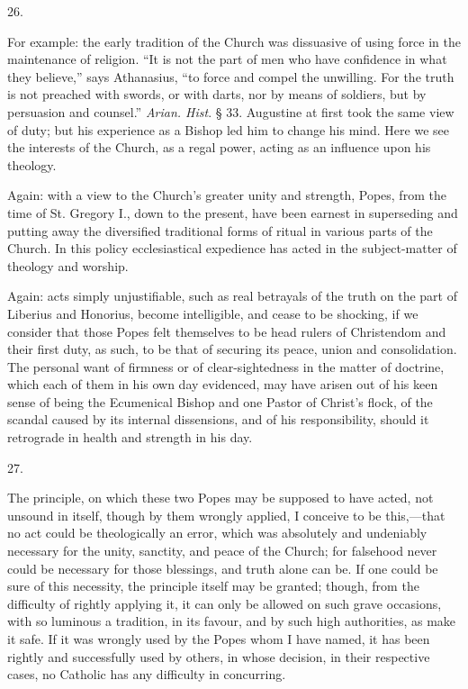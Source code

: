 26.

For example: the early tradition of the Church was dissuasive of
using force in the maintenance of religion. ``It is not the part
of men who have confidence in what they believe,'' says Athanasius,
``to force and compel the unwilling. For the truth is not preached
with swords, or with darts, nor by means of soldiers, but by
persuasion and counsel.'' \emph{Arian. Hist}. § 33. Augustine at
first took the same view of duty; but his experience as a Bishop led
him to change his mind. Here we see the interests of the Church, as a
regal power, acting as an influence upon his theology.

Again: with a view to the Church's greater unity and strength,
Popes, from the time of St. Gregory I., down to the present, have been
earnest in superseding and putting away the diversified traditional
forms of ritual in various parts of the Church. In this policy
ecclesiastical expedience has acted in the subject-matter of theology
and worship.

Again: acts simply unjustifiable, such as real betrayals of the
truth on the part of Liberius and Honorius, become intelligible, and
cease to be shocking, if we consider that those Popes felt themselves
to be head rulers of Christendom and their first duty, as
such, to be that of securing its peace, union and consolidation. The
personal want of firmness or of clear-sightedness in the matter of
doctrine, which each of them in his own day evidenced, may have arisen
out of his keen sense of being the Ecumenical Bishop and one Pastor of
Christ's flock, of the scandal caused by its internal dissensions, and
of his responsibility, should it retrograde in health and strength in
his day.

27.

The principle, on which these two Popes may be supposed to have
acted, not unsound in itself, though by them wrongly applied, I
conceive to be this,—that no act could be theologically an error,
which was absolutely and undeniably necessary for the unity, sanctity,
and peace of the Church; for falsehood never could be necessary for
those blessings, and truth alone can be. If one could be sure of this
necessity, the principle itself may be granted; though, from the
difficulty of rightly applying it, it can only be allowed on such
grave occasions, with so luminous a tradition, in its favour, and by
such high authorities, as make it safe. If it was wrongly used by the
Popes whom I have named, it has been rightly and successfully used by
others, in whose decision, in their respective cases, no Catholic has
any difficulty in concurring.

